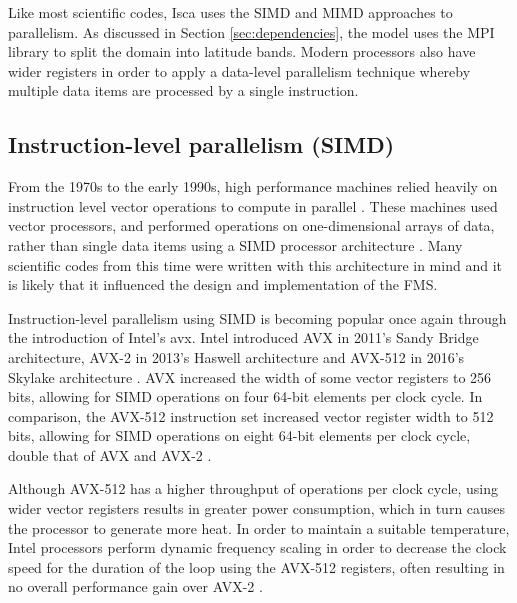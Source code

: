 \documentclass[a4paper,11pt]{report}
\begin{document}
\par
Like most scientific codes, Isca uses the SIMD and MIMD approaches to parallelism. As discussed in Section \ref{sec:dependencies}, the model uses the MPI library to split the domain into latitude bands. Modern processors also have wider registers in order to apply a data-level parallelism technique whereby multiple data items are processed by a single instruction. 

\subsection{Instruction-level parallelism (SIMD)}
From the 1970s to the early 1990s, high performance machines relied heavily on instruction level vector operations to compute in parallel \cite{6877473}. These machines used vector processors, and performed operations on one-dimensional arrays of data, rather than single data items using a SIMD processor architecture \cite{conte2000long}. Many scientific codes from this time were written with this architecture in mind and it is likely that it influenced the design and implementation of the FMS. 
\par
Instruction-level parallelism using SIMD is becoming popular once again through the introduction of Intel's \gls{avx}. Intel introduced AVX in 2011's Sandy Bridge architecture, AVX-2 in 2013's Haswell architecture and AVX-512 in 2016's Skylake architecture \cite{chris2011avx, intel2019avx}. AVX increased the width of some vector registers to 256 bits, allowing for SIMD operations on four 64-bit elements per clock cycle. In comparison, the AVX-512 instruction set increased vector register width to 512 bits, allowing for SIMD operations on eight 64-bit elements per clock cycle, double that of AVX and AVX-2 \cite{chris2011avx,xeon2680v4}.
\par
Although AVX-512 has a higher throughput of operations per clock cycle, using wider vector registers results in greater power consumption, which in turn causes the processor to generate more heat. In order to maintain a suitable temperature, Intel processors perform dynamic frequency scaling in order to decrease the clock speed for the duration of the loop using the AVX-512 registers, often resulting in no overall performance gain over AVX-2 \cite{gottschlag2018mechanism}.
\end{document}
